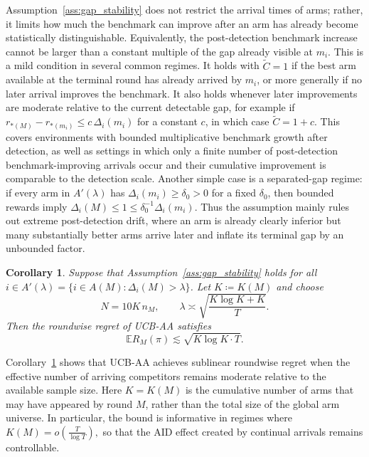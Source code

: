 \documentclass[
  12pt]{article}
\newtheorem{corollary}{Corollary}
\begin{document}
Assumption~\ref{ass:gap_stability} does not restrict the arrival times of arms;
rather, it limits how much the benchmark can improve after an arm has already
become statistically distinguishable. Equivalently, the post-detection benchmark
increase cannot be larger than a constant multiple of the gap already visible at
\(m_i\).
This is a mild condition in several common regimes. It holds with
\(\tilde C=1\) if the best arm available at the terminal round has already
arrived by \(m_i\), or more generally if no later arrival improves the benchmark.
It also holds whenever later improvements are moderate relative to the current
detectable gap, for example if
\(
r_{*(M)}-r_{*(m_i)}\le c\,\Delta_i(m_i)
\)
for a constant \(c\), in which case \(\tilde C=1+c\). This covers environments
with bounded multiplicative benchmark growth after detection, as well as
settings in which only a finite number of post-detection benchmark-improving
arrivals occur and their cumulative improvement is comparable to the detection
scale. Another simple case is a separated-gap regime: if every arm in
\(A'(\lambda)\) has \(\Delta_i(m_i)\ge \delta_0>0\) for a fixed \(\delta_0\),
then bounded rewards imply \(\Delta_i(M)\le 1\le \delta_0^{-1}\Delta_i(m_i)\).
Thus the assumption mainly rules out extreme post-detection drift, where an arm
is already clearly inferior but many substantially better arms arrive later and
inflate its terminal gap by an unbounded factor.


\begin{corollary}
\label{cor:ucb_aa_simplified}
Suppose that Assumption~\ref{ass:gap_stability} holds for all $i\in A'(\lambda)=\{i\in A(M):\Delta_i(M)>\lambda\}$. Let $K\coloneqq K(M)$ and choose
\[
N = 10K\,n_M,
\qquad
\lambda \asymp \sqrt{\frac{K\log K+K}{T}}.
\]
Then the roundwise regret of UCB-AA satisfies
\[
\mathbb{E}R_M(\pi)\lesssim \sqrt{K\log K\cdot T}.
\]
\end{corollary}

Corollary~\ref{cor:ucb_aa_simplified} shows that UCB-AA achieves sublinear roundwise regret when the effective
number of arriving competitors remains moderate relative to the available sample size.
Here \(K=K(M)\) is the cumulative number of arms that may have appeared by round \(M\),
rather than the total size of the global arm universe. In particular, the bound is informative
in regimes where \(
K(M)=o\left(\frac{T}{\log T}\right),
\)
so that the AID effect created by continual arrivals remains controllable.
\end{document}
